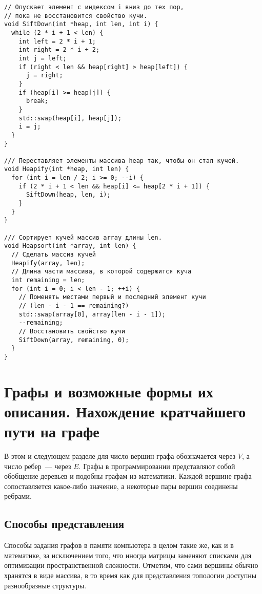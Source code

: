 \begin{verbatim}
// Опускает элемент с индексом i вниз до тех пор,
// пока не восстановится свойство кучи.
void SiftDown(int *heap, int len, int i) {
  while (2 * i + 1 < len) {
    int left = 2 * i + 1;
    int right = 2 * i + 2;
    int j = left;
    if (right < len && heap[right] > heap[left]) {
      j = right;
    }
    if (heap[i] >= heap[j]) {
      break;
    }
    std::swap(heap[i], heap[j]);
    i = j;
  }
}

/// Переставляет элементы массива heap так, чтобы он стал кучей.
void Heapify(int *heap, int len) {
  for (int i = len / 2; i >= 0; --i) {
    if (2 * i + 1 < len && heap[i] <= heap[2 * i + 1]) {
      SiftDown(heap, len, i);
    }
  }
}

/// Сортирует кучей массив array длины len.
void Heapsort(int *array, int len) {
  // Сделать массив кучей
  Heapify(array, len);
  // Длина части массива, в которой содержится куча
  int remaining = len;
  for (int i = 0; i < len - 1; ++i) {
    // Поменять местами первый и последний элемент кучи
    // (len - i - 1 == remaining?)
    std::swap(array[0], array[len - i - 1]);
    --remaining;
    // Восстановить свойство кучи
    SiftDown(array, remaining, 0);
  }
}
\end{verbatim}
\section{Графы и возможные формы их описания. Нахождение кратчайшего пути на графе}
В этом и следующем разделе для число вершин графа обозначается через $V$, а число ребер~--- через $E$.
Графы в программировании представляют собой обобщение деревьев и подобны графам из математики.
Каждой вершине графа сопоставляется какое-либо значение, а некоторые пары вершин соединены
ребрами.

\subsection{Способы представления}
Способы задания графов в памяти компьютера в целом такие же, как и в математике,
за исключением того, что иногда матрицы заменяют списками для оптимизации
пространственной сложности. Отметим, что сами вершины обычно хранятся в виде
массива, в то время как для представления топологии доступны разнообразные структуры.

